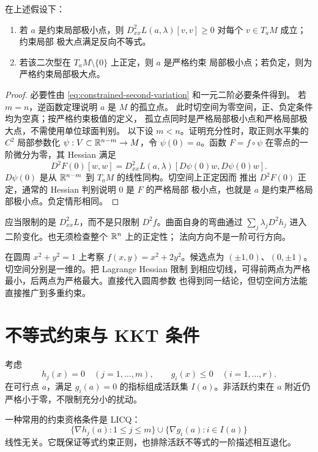 \begin{theorem}[等式约束的二阶条件]
\label{thm:constrained-second-order-test}
在上述假设下：
\begin{enumerate}[label=\textup{(\roman*)}]
 \item 若 $a$ 是约束局部极小点，则
 $D^2_{xx}L(a,\lambda)[v,v]\ge0$ 对每个 $v\in T_aM$ 成立；约束局部
 极大点满足反向不等式。
 \item 若该二次型在 $T_aM\setminus\{0\}$ 上正定，则 $a$ 是严格约束
 局部极小点；若负定，则为严格约束局部极大点。
\end{enumerate}
\end{theorem}

\begin{proof}
必要性由 \eqref{eq:constrained-second-variation} 和一元二阶必要条件得到。
若 \(m=n\)，逆函数定理说明 \(a\) 是 \(M\) 的孤立点。
此时切空间为零空间，正、负定条件均为空真；按严格约束极值的定义，
孤立点同时是严格局部极小点和严格局部极大点，不需使用单位球面判别。
以下设 \(m<n\)。证明充分性时，取正则水平集的 $C^2$ 局部参数化
$\psi:V\subset\mathbb{R}^{n-m}\to M$，令 $\psi(0)=a$。函数
$F=f\circ\psi$ 在零点的一阶微分为零，其 Hessian 满足
\[
 D^2F(0)[w,w]
 =D^2_{xx}L(a,\lambda)[D\psi(0)w,D\psi(0)w].
\]
$D\psi(0)$ 是从 $\mathbb{R}^{n-m}$ 到 $T_aM$ 的线性同构。切空间上正定因而
推出 $D^2F(0)$ 正定，通常的 Hessian 判别说明 $0$ 是 $F$ 的严格局部
极小点，也就是 $a$ 是约束严格局部极小点。负定情形相同。
\end{proof}

应当限制的是 $D^2_{xx}L$，而不是只限制 $D^2f$。曲面自身的弯曲通过
$\sum_j\lambda_jD^2h_j$ 进入二阶变化。也无须检查整个 $\mathbb{R}^n$ 上的正定性；
法向方向不是一阶可行方向。

\begin{example}
在圆周 $x^2+y^2=1$ 上考察 $f(x,y)=x^2+2y^2$。候选点为
$(\pm1,0)$、$(0,\pm1)$。切空间分别是一维的。把 Lagrange Hessian 限制
到相应切线，可得前两点为严格最小，后两点为严格最大。直接代入圆周参数
也得到同一结论，但切空间方法能直接推广到多重约束。
\end{example}

\section{不等式约束与 KKT 条件}

考虑
\[
 h_j(x)=0\quad(j=1,\ldots,m),
 \qquad
 g_i(x)\le0\quad(i=1,\ldots,r).
\]
在可行点 $a$，满足 $g_i(a)=0$ 的指标组成活跃集 $I(a)$。非活跃约束在
$a$ 附近仍严格小于零，不限制充分小的扰动。

一种常用的约束资格条件是 LICQ：
\[
 \{\nabla h_j(a):1\le j\le m\}
 \cup\{\nabla g_i(a):i\in I(a)\}
\]
线性无关。它既保证等式约束正则，也排除活跃不等式的一阶描述相互退化。

